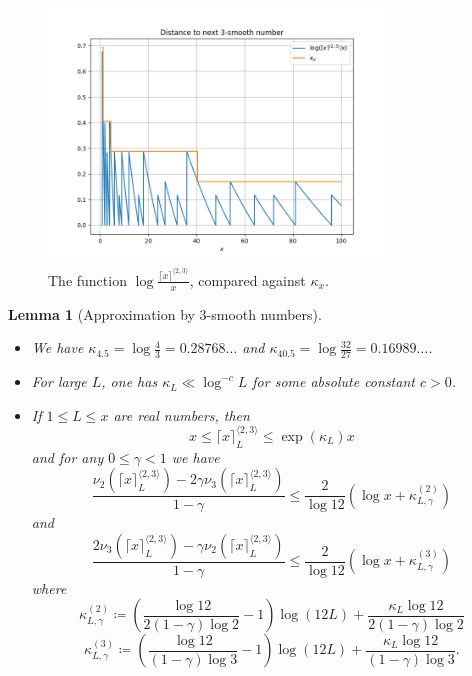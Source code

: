 \documentclass[12pt,a4paper,reqno]{amsart}
\numberwithin{equation}{section}
\theoremstyle{plain}
\newtheorem{lemma}[theorem]{Lemma}
\theoremstyle{definition}
\begin{document}
\begin{figure}
  \centering
  \includegraphics[width=0.8\textwidth]{next_smooth.png}
  \caption{The function $\log \frac{\lceil x \rceil^{\langle 2,3 \rangle}}{x}$, compared against $\kappa_x$. 
  }\label{fig:nextsmooth}
  \end{figure}


\begin{lemma}[Approximation by $3$-smooth numbers]\label{power-lemma}\ 
\begin{itemize}
\item[(i)]  We have $\kappa_{4.5} = \log\frac{4}{3} = 0.28768\dots$ and $\kappa_{40.5} = \log \frac{32}{27} = 0.16989\dots$.
\item[(ii)]  For large $L$, one has $\kappa_L \ll \log^{-c} L$ for some absolute constant $c>0$.
\item[(iii)]  If $1 \leq L \leq x$ are real numbers, then
\begin{equation}\label{mod-kappa}
  x \leq \lceil x \rceil^{\langle 2,3\rangle}_L \leq \exp(\kappa_L) x 
\end{equation}
and for any $0 \leq \gamma < 1$ we have
\begin{equation}\label{12-2}
\frac{\nu_2(\lceil x \rceil^{\langle 2,3\rangle}_L) - 2 \gamma \nu_3(\lceil x \rceil^{\langle 2,3\rangle}_L)}{1-\gamma} \leq \frac{2}{\log 12} \left( \log x  + \kappa^{(2)}_{L,\gamma} \right)
\end{equation}
and
\begin{equation}\label{12-3}
\frac{2\nu_3(\lceil x \rceil^{\langle 2,3\rangle}_L) - \gamma \nu_2(\lceil x \rceil^{\langle 2,3\rangle}_L)}{1-\gamma} \leq \frac{2}{\log 12} \left( \log x + \kappa^{(3)}_{L,\gamma} \right)
\end{equation}
where
\begin{equation}\label{kappastar-2-def}
\kappa^{(2)}_{L,\gamma} \coloneqq \left(\frac{\log 12}{2(1-\gamma)\log 2} - 1\right) \log(12L) + \frac{\kappa_L\log 12}{2 (1-\gamma) \log 2}
\end{equation}
\begin{equation}\label{kappastar-3-def}
  \kappa^{(3)}_{L,\gamma} \coloneqq \left(\frac{\log 12}{(1-\gamma)\log 3} - 1\right) \log(12L) + \frac{\kappa_L\log 12}{(1-\gamma)\log 3}.
\end{equation}
\end{itemize}
\end{lemma}
\end{document}
